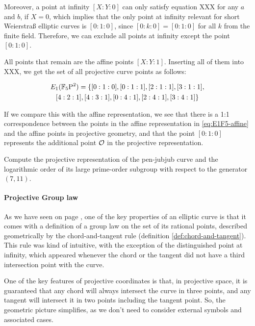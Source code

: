 \begin{example}
Moreover, a point at infinity $[X:Y:0]$ can only satisfy equation XXX for any $a$ and $b$, if $X=0$, which implies that the only point at infinity relevant for short Weierstraß elliptic curves is $[0:1:0]$, since $[0:k:0]= [0:1:0]$ for all $k$ from the finite field. Therefore, we can exclude all points at infinity except the point $[0:1:0]$.

All points that remain are the affine points $[X:Y:1]$. Inserting all of them into XXX, we get the set of all projective curve points as follows:

\begin{multline*}
E_1(\mathbb{F}_5\mathrm{P}^2)=\{[0:1:0], [0:1:1], [2:1:1], [3:1:1], \\ [4:2:1], [4:3:1], [0:4:1], [2:4:1], [3:4:1]\}
\end{multline*}

If we compare this with the affine representation, we see that there is a 1:1 correspondence between the points in the affine representation in \ref{eq:E1F5-affine} and the affine points in projective geometry, and that the point $[0:1:0]$ represents the additional point $\mathcal{O}$ in the projective representation.
\end{example} 

\begin{exercise}
Compute the projective representation of the pen-jubjub curve and the logarithmic order of its large prime-order subgroup with respect to the generator $(7,11)$.
\end{exercise}

\paragraph{Projective Group law}
As we have seen on page \pageref{chap:elliptic-curves}, one of the key properties of an elliptic curve is that it comes with a definition of a group law on the set of its rational points, described geometrically by the chord-and-tangent rule (definition \ref{def:chord-and-tangent}). This rule was kind of intuitive, with the exception of the distinguished point at infinity, which appeared whenever the chord or the tangent did not have a third intersection point with the curve.

One of the key features of projective coordinates is that, in projective space, it is guaranteed that any chord will always intersect the curve in three points, and any tangent will intersect it in two points including the tangent point. So, the geometric picture simplifies, as we don't need to consider external symbols and associated cases.

